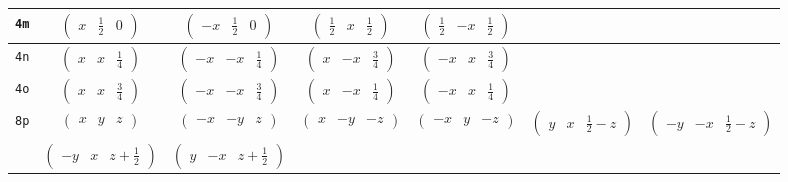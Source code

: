 \documentclass[fleqn,9pt,landscape]{jsarticle}
\begin{document}
\begin{center}
\begin{longtable}{ccccccc}
{\tt 4m} & $ \begin{pmatrix} x & \frac{1}{2} & 0 \end{pmatrix} $ & $ \begin{pmatrix} - x & \frac{1}{2} & 0 \end{pmatrix} $ & $ \begin{pmatrix} \frac{1}{2} & x & \frac{1}{2} \end{pmatrix} $ & $ \begin{pmatrix} \frac{1}{2} & - x & \frac{1}{2} \end{pmatrix} $ & $  $ & $  $ \\ \hline
{\tt 4n} & $ \begin{pmatrix} x & x & \frac{1}{4} \end{pmatrix} $ & $ \begin{pmatrix} - x & - x & \frac{1}{4} \end{pmatrix} $ & $ \begin{pmatrix} x & - x & \frac{3}{4} \end{pmatrix} $ & $ \begin{pmatrix} - x & x & \frac{3}{4} \end{pmatrix} $ & $  $ & $  $ \\ \hline
{\tt 4o} & $ \begin{pmatrix} x & x & \frac{3}{4} \end{pmatrix} $ & $ \begin{pmatrix} - x & - x & \frac{3}{4} \end{pmatrix} $ & $ \begin{pmatrix} x & - x & \frac{1}{4} \end{pmatrix} $ & $ \begin{pmatrix} - x & x & \frac{1}{4} \end{pmatrix} $ & $  $ & $  $ \\ \hline
{\tt 8p} & $ \begin{pmatrix} x & y & z \end{pmatrix} $ & $ \begin{pmatrix} - x & - y & z \end{pmatrix} $ & $ \begin{pmatrix} x & - y & - z \end{pmatrix} $ & $ \begin{pmatrix} - x & y & - z \end{pmatrix} $ & $ \begin{pmatrix} y & x & \frac{1}{2} - z \end{pmatrix} $ & $ \begin{pmatrix} - y & - x & \frac{1}{2} - z \end{pmatrix} $ \\
& $ \begin{pmatrix} - y & x & z + \frac{1}{2} \end{pmatrix} $ & $ \begin{pmatrix} y & - x & z + \frac{1}{2} \end{pmatrix} $ & $  $ & $  $ & $  $ & $  $ \\
\end{longtable}
\end{center}
\end{document}
